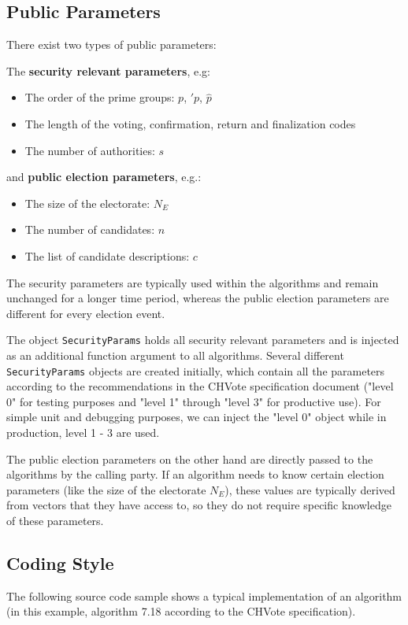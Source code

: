 \subsection{Public Parameters}
There exist two types of public parameters:

The \textbf{security relevant parameters}, e.g:

\begin{itemize}
	\item The order of the prime groups: $p$, $\prime{p}$, $\hat{p}$
	\item The length of the voting, confirmation, return and finalization codes
	\item The number of authorities: $s$
\end{itemize}

and \textbf{public election parameters}, e.g.:

\begin{itemize}
	\item The size of the electorate: $N_E$
	\item The number of candidates: $n$
	\item The list of candidate descriptions: $c$
\end{itemize}

The security parameters are typically used within the algorithms and remain unchanged for a longer time period, whereas the public election parameters are different for every election event.

The object \texttt{SecurityParams} holds all security relevant parameters and is injected as an additional function argument to all algorithms. Several different \texttt{SecurityParams} objects are created initially, which contain all the parameters according to the recommendations in the CHVote specification document ("level 0" for testing purposes and "level 1" through "level 3" for productive use). For simple unit and debugging purposes, we can inject the "level 0" object while in production, level 1 - 3 are used.

The public election parameters on the other hand are directly passed to the algorithms by the calling party. If an algorithm needs to know certain election parameters (like the size of the electorate $N_E$), these values are typically derived from vectors that they have access to, so they do not require specific knowledge of these parameters.

\subsection{Coding Style}
The following source code sample shows a typical implementation of an algorithm (in this example, algorithm 7.18 according to the CHVote specification).


